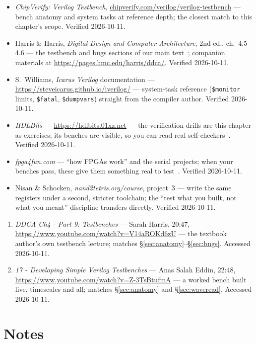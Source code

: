 \begin{itemize}
\item \emph{ChipVerify: Verilog Testbench},
\url{chipverify.com/verilog/verilog-testbench} ---
bench anatomy and system tasks at reference depth; the closest match
to this chapter's scope. Verified 2026-10-11.
\item Harris \& Harris, \emph{Digital Design and Computer
Architecture}, 2nd ed., ch.~4.5--4.6 --- the testbench and bugs
sections of our main text~\cite{ddca}; companion materials at
\url{https://pages.hmc.edu/harris/ddca/}. Verified 2026-10-11.
\item S.~Williams, \emph{Icarus Verilog} documentation ---
\url{https://steveicarus.github.io/iverilog/} --- system-task
reference (\texttt{\$monitor} limits, \texttt{\$fatal},
\texttt{\$dumpvars}) straight from the compiler author. Verified
2026-10-11.
\item \emph{HDLBits} --- \url{https://hdlbits.01xz.net} --- the
verification drills are this chapter as exercises; its benches are
visible, so you can read real self-checkers~\cite{hdlbits}. Verified
2026-10-11.
\item \emph{fpga4fun.com} --- ``how FPGAs work'' and the serial
projects; when your benches pass, these give them something real to
test~\cite{fpga4fun}. Verified 2026-10-11.
\item Nisan \& Schocken, \emph{nand2tetris.org/course}, project~3
--- write the same registers under a second, stricter toolchain; the
``test what you built, not what you meant'' discipline transfers
directly. Verified 2026-10-11.
\end{itemize}

\begin{rulebox}
\begin{enumerate}
\item \emph{DDCA Ch4 - Part 9: Testbenches} --- Sarah Harris,
20:47, \url{https://www.youtube.com/watch?v=V14aROKd6zU} --- the
textbook author's own testbench lecture; matches
\S\ref{sec:anatomy}--\S\ref{sec:bugs}. Accessed 2026-10-11.
\item \emph{17 - Developing Simple Verilog Testbenches} --- Anas
Salah Eddin, 22:48,
\url{https://www.youtube.com/watch?v=Z-3TsBtufmA} --- a worked bench
built live, timescales and all; matches \S\ref{sec:anatomy} and
\S\ref{sec:waveread}. Accessed 2026-10-11.
\end{enumerate}
\end{rulebox}

\section*{Notes}

